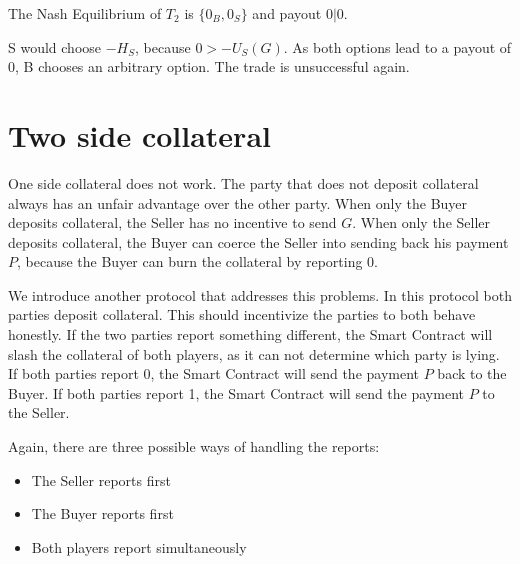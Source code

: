 \documentclass{cacthesis}
\begin{document}
The Nash Equilibrium of $T_2$ is $\{0_B, 0_S\}$ and payout $0 | 0$. \newline

S would choose $-H_S$, because $0>-U_S(G)$.\newline
As both options lead to a payout of 0, B chooses an arbitrary option. The trade is unsuccessful again.


\section{Two side collateral}
One side collateral does not work. The party that does not deposit collateral always has an unfair advantage over the other party. \newline
When only the Buyer deposits collateral, the Seller has no incentive to send $G$. \newline
When only the Seller deposits collateral, the Buyer can coerce the Seller into sending back his payment $P$, because the Buyer can burn the collateral by reporting 0.\newline 

We introduce another protocol that addresses this problems. In this protocol both parties deposit collateral. This should incentivize the parties to both behave honestly.\newline
If the two parties report something different, the Smart Contract will slash the collateral of both players, as it can not determine which party is lying. If both parties report 0, the Smart Contract will send the payment $P$ back to the Buyer. If both parties report 1, the Smart Contract will send the payment $P$ to the Seller.  \newline

Again, there are three possible ways of handling the reports:
\begin{itemize}
    \item The Seller reports first
    \item The Buyer reports first
    \item Both players report simultaneously
\end{itemize}
\end{document}
